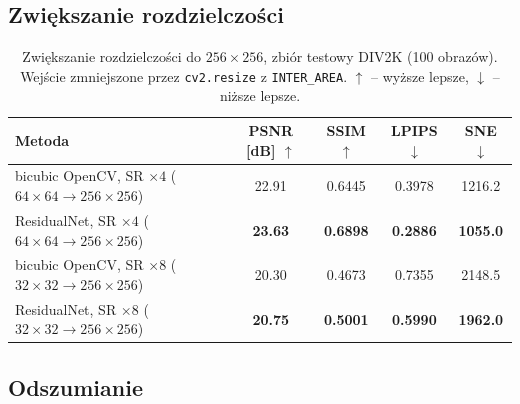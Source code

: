 \documentclass[11pt,a4paper]{article}
\newcommand{\code}[1]{\texttt{\mdseries #1}}
\newcommand{\best}[1]{\textbf{#1}}
\newcommand{\nazwa}{ResidualNet}
\begin{document}
\subsection{Zwiększanie rozdzielczości}

\begin{table}[H]
  \centering\small
  \caption{Zwiększanie rozdzielczości do $256\times256$, zbiór testowy DIV2K (100 obrazów).
    Wejście zmniejszone przez \code{cv2.resize} z \code{INTER\_AREA}. $\uparrow$ -- wyższe lepsze, $\downarrow$ -- niższe lepsze.}
  \label{tab:wyniki-sr}
  \begin{tabular}{@{}lS[table-format=2.2]S[table-format=1.4]S[table-format=1.4]S[table-format=4.1]@{}}
    \toprule
    Metoda & {PSNR [dB] $\uparrow$} & {SSIM $\uparrow$} & {LPIPS $\downarrow$} & {SNE $\downarrow$} \\
    \midrule
    bicubic OpenCV, SR $\times4$ ($64\times64\to256\times256$)     & 22.91 & 0.6445 & 0.3978 & 1216.2 \\
    \nazwa, SR $\times4$ ($64\times64\to256\times256$)             & \best{23.63} & \best{0.6898} & \best{0.2886} & \best{1055.0} \\
    \midrule
    bicubic OpenCV, SR $\times8$ ($32\times32\to256\times256$)     & 20.30 & 0.4673 & 0.7355 & 2148.5 \\
    \nazwa, SR $\times8$ ($32\times32\to256\times256$)             & \best{20.75} & \best{0.5001} & \best{0.5990} & \best{1962.0} \\
    \bottomrule
  \end{tabular}
\end{table}

\subsection{Odszumianie}
\end{document}

